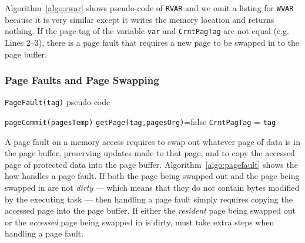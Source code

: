 Algorithm~\ref{algo:rwar} shows pseudo-code of \texttt{RVAR} and we omit a
listing for {\tt WVAR} because it is very similar except it writes the memory
location and returns nothing.  If the page tag of the variable \texttt{var} and
\texttt{CrntPagTag} are not equal (e.g. Lines 2--3), there is a page fault
that requires a new page to be swapped in to the page buffer. 


\subsubsection{Page Faults and Page Swapping}

\begin{algorithm}[t]
	\caption{\texttt{PageFault(tag)} pseudo-code}
	\label{algo:pagefault}
	\scriptsize
	\begin{algorithmic}[1]
			
		\State \texttt{pageCommit(pagesTemp)} 
		\EndIf
		 
		 
		\Else
		\State \texttt{getPage(tag,pagesOrg)}=false 
		\EndIf 
		\State \texttt{CrntPagTag} = \texttt{tag} 
	\end{algorithmic}
\end{algorithm}

A page fault on a memory access requires \sys to swap out whatever page of data
is in the page buffer, preserving updates made to that page, and to copy the
accessed page of protected data into the page buffer. 
%
Algorithm~\ref{algo:pagefault} shows the how \sys handles a page fault.  If
both the page being swapped out and the page being swapped in are not {\em
dirty} --- which means that they do not contain bytes modified by the executing
task --- then handling a page fault simply requires copying the accessed page
into the page buffer.  If either the {\em resident} page being swapped out or
the {\em accessed} page being swapped in is dirty, \sys must take extra steps
when handling a page fault. 

